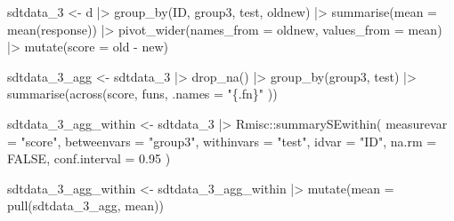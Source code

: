 \documentclass[
  man,floatsintext]{apa7}
\newenvironment{Shaded}{\begin{snugshade}}{\end{snugshade}}
\newcommand{\AttributeTok}[1]{\textcolor[rgb]{0.77,0.63,0.00}{#1}}
\newcommand{\ConstantTok}[1]{\textcolor[rgb]{0.00,0.00,0.00}{#1}}
\newcommand{\FloatTok}[1]{\textcolor[rgb]{0.00,0.00,0.81}{#1}}
\newcommand{\FunctionTok}[1]{\textcolor[rgb]{0.00,0.00,0.00}{#1}}
\newcommand{\NormalTok}[1]{#1}
\newcommand{\OtherTok}[1]{\textcolor[rgb]{0.56,0.35,0.01}{#1}}
\newcommand{\SpecialCharTok}[1]{\textcolor[rgb]{0.00,0.00,0.00}{#1}}
\newcommand{\StringTok}[1]{\textcolor[rgb]{0.31,0.60,0.02}{#1}}
\begin{document}
\begin{Shaded}
\begin{Highlighting}[]
\NormalTok{sdtdata\_3 }\OtherTok{\textless{}{-}}\NormalTok{ d }\SpecialCharTok{|\textgreater{}}
  \FunctionTok{group\_by}\NormalTok{(ID, group3, test, oldnew) }\SpecialCharTok{|\textgreater{}}
  \FunctionTok{summarise}\NormalTok{(}\AttributeTok{mean =} \FunctionTok{mean}\NormalTok{(response)) }\SpecialCharTok{|\textgreater{}}
  \FunctionTok{pivot\_wider}\NormalTok{(}\AttributeTok{names\_from =}\NormalTok{ oldnew, }\AttributeTok{values\_from =}\NormalTok{ mean) }\SpecialCharTok{|\textgreater{}}
  \FunctionTok{mutate}\NormalTok{(}\AttributeTok{score =}\NormalTok{ old }\SpecialCharTok{{-}}\NormalTok{ new)}

\NormalTok{sdtdata\_3\_agg }\OtherTok{\textless{}{-}}\NormalTok{ sdtdata\_3 }\SpecialCharTok{|\textgreater{}}
  \FunctionTok{drop\_na}\NormalTok{() }\SpecialCharTok{|\textgreater{}}
  \FunctionTok{group\_by}\NormalTok{(group3, test) }\SpecialCharTok{|\textgreater{}}
  \FunctionTok{summarise}\NormalTok{(}\FunctionTok{across}\NormalTok{(score, funs,}
    \AttributeTok{.names =} \StringTok{"\{.fn\}"}
\NormalTok{  ))}

\NormalTok{sdtdata\_3\_agg\_within }\OtherTok{\textless{}{-}}\NormalTok{ sdtdata\_3 }\SpecialCharTok{|\textgreater{}}
\NormalTok{  Rmisc}\SpecialCharTok{::}\FunctionTok{summarySEwithin}\NormalTok{(}
    \AttributeTok{measurevar =} \StringTok{"score"}\NormalTok{,}
    \AttributeTok{betweenvars =} \StringTok{"group3"}\NormalTok{,}
    \AttributeTok{withinvars =} \StringTok{"test"}\NormalTok{,}
    \AttributeTok{idvar =} \StringTok{"ID"}\NormalTok{,}
    \AttributeTok{na.rm =} \ConstantTok{FALSE}\NormalTok{,}
    \AttributeTok{conf.interval =} \FloatTok{0.95}
\NormalTok{  )}

\NormalTok{sdtdata\_3\_agg\_within }\OtherTok{\textless{}{-}}\NormalTok{ sdtdata\_3\_agg\_within }\SpecialCharTok{|\textgreater{}}
  \FunctionTok{mutate}\NormalTok{(}\AttributeTok{mean =} \FunctionTok{pull}\NormalTok{(sdtdata\_3\_agg, mean))}


\end{Highlighting}
\end{Shaded}
\end{document}

